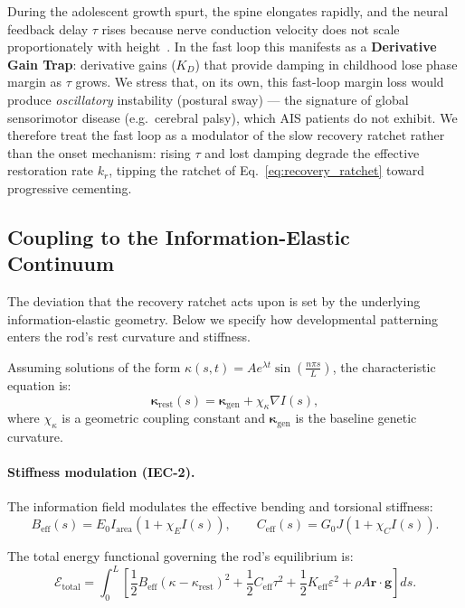 During the adolescent growth spurt, the spine elongates rapidly, and the neural feedback delay $\tau$ rises because nerve conduction velocity does not scale proportionately with height~\cite{lang1985nerve, robinson2001nerve}. In the fast loop this manifests as a \textbf{Derivative Gain Trap}: derivative gains ($K_D$) that provide damping in childhood lose phase margin as $\tau$ grows. We stress that, on its own, this fast-loop margin loss would produce \emph{oscillatory} instability (postural sway) --- the signature of global sensorimotor disease (e.g.\ cerebral palsy), which AIS patients do not exhibit. We therefore treat the fast loop as a modulator of the slow recovery ratchet rather than the onset mechanism: rising $\tau$ and lost damping degrade the effective restoration rate $k_r$, tipping the ratchet of Eq.~\ref{eq:recovery_ratchet} toward progressive cementing.

\subsection{Coupling to the Information-Elastic Continuum}

The deviation that the recovery ratchet acts upon is set by the underlying information-elastic geometry. Below we specify how developmental patterning enters the rod's rest curvature and stiffness.

Assuming solutions of the form $\kappa(s,t) = A e^{\lambda t} \sin\left(\frac{n\pi s}{L}\right)$, the characteristic equation is:
\begin{equation}
\boldsymbol{\kappa}_{\mathrm{rest}}(s) = \boldsymbol{\kappa}_{\mathrm{gen}} + \chi_\kappa \nabla I(s),
\label{eq:kappa_rest_iec}
\end{equation}
where $\chi_\kappa$ is a geometric coupling constant and $\boldsymbol{\kappa}_{\mathrm{gen}}$ is the baseline genetic curvature.

\paragraph{Stiffness modulation (IEC-2).}
The information field modulates the effective bending and torsional stiffness:
\begin{equation}
B_{\mathrm{eff}}(s) = E_0 I_{\mathrm{area}} (1 + \chi_E I(s)), \qquad
C_{\mathrm{eff}}(s) = G_0 J (1 + \chi_C I(s)).
\label{eq:stiffness_modulation}
\end{equation}

The total energy functional governing the rod's equilibrium is:
\begin{equation}
\mathcal{E}_{\mathrm{total}} = \int_0^L \left[ \frac{1}{2} B_{\mathrm{eff}}(\kappa - \kappa_{\mathrm{rest}})^2 + \frac{1}{2} C_{\mathrm{eff}} \tau^2 + \frac{1}{2} K_{\mathrm{eff}} \varepsilon^2 + \rho A \mathbf{r} \cdot \mathbf{g} \right] ds.
\label{eq:iec_energy}
\end{equation}

